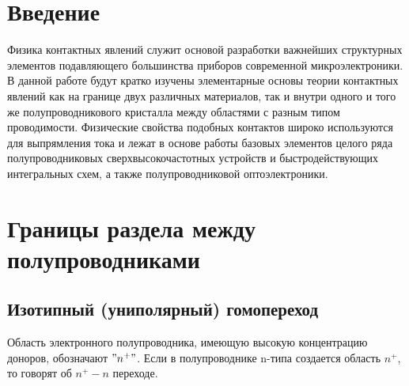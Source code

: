 
\newcommand{\vH}{\textbf{H}}
\newcommand{\vE}{\textbf{E}}
\newcommand{\vB}{\textbf{B}}
\newcommand{\vD}{\textbf{D}}
\newcommand{\vr}{\textbf{r}}
\newcommand{\vj}{\textbf{j}}
\newcommand{\vk}{\textbf{k}}
\newcommand{\vx}{\textbf{x}}
\newcommand{\vy}{\textbf{y}}
\newcommand{\vz}{\textbf{z}}


\def\labauthors{Карусевич А.А., Шиков А.П.}
\def\labgroup{440}
\def\labnumber{1}
\def\labtheme{Измерение статических характеристик полупроводникового диода}
\renewcommand{\vec}{\mathbf}
\renewcommand{\phi}{\varphi}
\renewcommand{\hat}{\widehat}



\section{Введение}
Физика контактных явлений служит основой разработки важнейших структурных элементов подавляющего большинства приборов современной микроэлектроники. В данной работе будут кратко изучены элементарные основы теории контактных явлений как на границе двух различных материалов, так и внутри одного и того же полупроводникового кристалла между областями с разным типом проводимости. Физические свойства подобных контактов широко используются для выпрямления тока и лежат в основе работы базовых элементов целого ряда полупроводниковых сверхвысокочастотных устройств и быстродействующих интегральных схем, а также полупроводниковой оптоэлектроники.

\section{Границы раздела между полупроводниками}
\subsection{Изотипный (униполярный) гомопереход}
Область электронного полупроводника, имеющую высокую концентрацию доноров, обозначают $"n^+"$. Если в полупроводнике n-типа создается область $n^+$, то говорят об $n^+-n$ переходе. 

